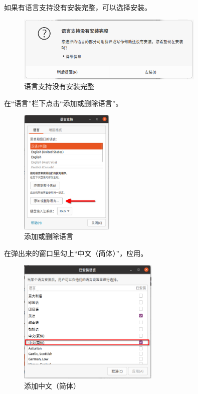 \documentclass[UTF-8]{ctexart}
\begin{document}
				如果有语言支持没有安装完整，可以选择安装。
				
				\begin{figure}[H]
					\centering
					\includegraphics[width=0.8\textwidth]{fig/langs_support.png}
					\caption*{语言支持没有安装完整}
				\end{figure}
				
				在“语言”栏下点击“添加或删除语言”。
				
				\begin{figure}[H]
					\centering
					\includegraphics[width=0.4\textwidth]{fig/add_or_del_langs.png}
					\caption*{添加或删除语言}
				\end{figure}
				
				在弹出来的窗口里勾上“中文（简体）”，应用。
				
				\begin{figure}[H]
					\centering
					\includegraphics[width=0.6\textwidth]{fig/add_zh_cn.png}
					\caption*{添加中文（简体）}
				\end{figure}
			
\end{document}
